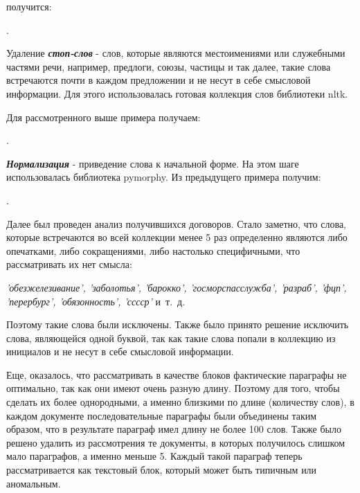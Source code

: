 \documentclass[12pt]{article}
\newcounter{c_tab}
\begin{document}
\vspace{13pt}
\noindent получится:

\vspace{13pt}
.

 \vspace{13pt}

Удаление \textbf{\textit{стоп-слов}} - слов, которые являются местоимениями или служебными частями речи, например, предлоги, союзы, частицы и так далее, такие слова встречаются почти в каждом предложении и не несут в себе смысловой информации. Для этого использовалась готовая коллекция слов библиотеки nltk. 

Для рассмотренного выше примера получаем:

\vspace{13pt}
.
\vspace{13pt}

\textbf{\textit{Нормализация}} - приведение слова к начальной форме. На этом шаге использовалась библиотека pymorphy. Из предыдущего примера получим:

\vspace{13pt}
.
\vspace{13pt}

Далее был проведен анализ получившихся договоров. Стало заметно, что слова, которые встречаются во всей коллекции менее 5 раз определенно являются либо опечатками, либо сокращениями, либо настолько специфичными, что рассматривать их нет смысла: 

\vspace{10pt}
\noindent\textit{'обезжелезивание', 'заболотья', 'барокко', 'госморспасслужба', 'разраб', 'фцп', 'перербург', 'обязонность', 'сссср'} и~т.~д.
\vspace{10pt}

Поэтому такие слова были исключены. Также было принято решение исключить слова, являющейся одной буквой, так как такие слова попали в коллекцию из инициалов и не несут в себе смысловой информации.

Еще, оказалось, что рассматривать в качестве блоков фактические параграфы не оптимально, так как они имеют очень разную длину. Поэтому для того, чтобы сделать их более однородными, а именно близкими по длине (количеству слов), в каждом документе последовательные параграфы были объединены таким образом, что в результате параграф имел длину не более 100 слов. Также было решено удалить из рассмотрения те документы, в которых получилось слишком мало параграфов, а именно меньше 5. Каждый такой параграф теперь рассматривается как текстовый блок, который может быть типичным или аномальным. 
\end{document}
